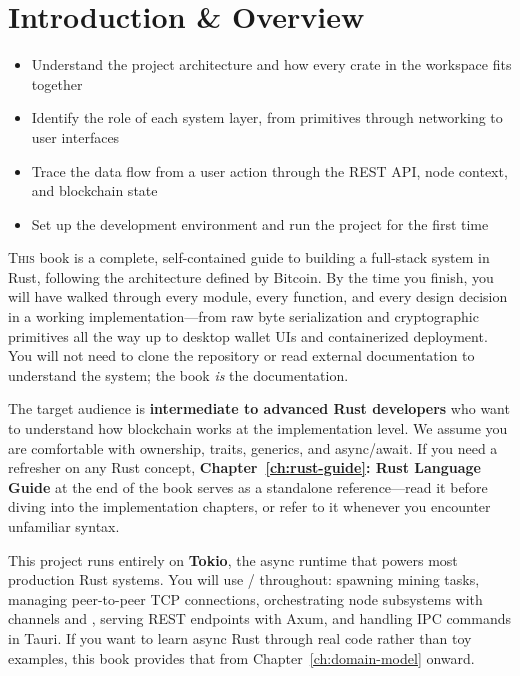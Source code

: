 \chapter{Introduction \& Overview}
\label{ch:introduction}

\begin{learnbox}
\begin{itemize}
  \item Understand the project architecture and how every crate in the workspace fits together
  \item Identify the role of each system layer, from primitives through networking to user interfaces
  \item Trace the data flow from a user action through the REST API, node context, and blockchain state
  \item Set up the development environment and run the project for the first time
\end{itemize}
\end{learnbox}

\lettrine{T}{his} book is a complete, self-contained guide to building a full-stack  system in Rust, following the architecture defined by Bitcoin. By the time you finish, you will have walked through every module, every function, and every design decision in a working implementation---from raw byte serialization and cryptographic primitives all the way up to desktop wallet UIs and containerized deployment. You will not need to clone the repository or read external documentation to understand the system; the book \emph{is} the documentation.

The target audience is \textbf{intermediate to advanced Rust developers} who want to understand how blockchain works at the implementation level. We assume you are comfortable with ownership, traits, generics, and async/await. If you need a refresher on any Rust concept, \textbf{Chapter~\ref{ch:rust-guide}: Rust Language Guide} at the end of the book serves as a standalone reference---read it before diving into the implementation chapters, or refer to it whenever you encounter unfamiliar syntax.

\begin{notebox}
This project runs entirely on \textbf{Tokio}, the async runtime that powers most production Rust systems. You will use / throughout: spawning mining tasks, managing peer-to-peer TCP connections, orchestrating node subsystems with channels and , serving REST endpoints with Axum, and handling IPC commands in Tauri. If you want to learn async Rust through real code rather than toy examples, this book provides that from Chapter~\ref{ch:domain-model} onward.
\end{notebox}

